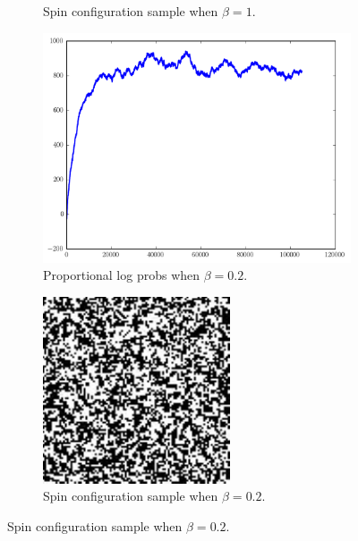 \begin{figure}
\begin{subfigure}[b]{.49\textwidth}
		\caption{Spin configuration sample when $\beta = 1$.}
		\label{fig:config1}
	\end{subfigure}
	\begin{subfigure}[b]{.49\textwidth}
		\centering
		\includegraphics[width=\textwidth]{beta0_2_logprobs.pdf}
		\caption{Proportional log probs when $\beta = 0.2$.}
		\label{fig:lprobs2}
	\end{subfigure}
	\begin{subfigure}[b]{.49\textwidth}
		\centering
		\includegraphics[width=.75\textwidth]{beta0_2.pdf}
		\caption{Spin configuration sample when $\beta = 0.2$.}
		\label{fig:config2}
	\end{subfigure}
\end{figure}
